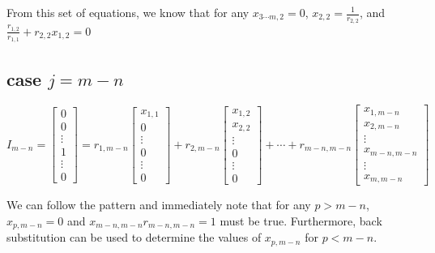 \documentclass[a4paper,12pt]{article}
\begin{document}
From this set of equations, we know that for any $x_{3\cdots m, 2} =0$, $x_{2,2}=\frac{1}{r_{2,2}}$, and $\frac{r_{1,2}}{r_{1,1}} + r_{2,2}x_{1,2} =0$


\subsection{case $j=m-n$ }



\begin{equation}
I_{m-n} =\begin{bmatrix}
           0 \\
           0 \\
           \vdots \\
           1 \\
           \vdots \\
           0
         \end{bmatrix} = r_{1,m-n} \begin{bmatrix}
           x_{1,1} \\
           0 \\
           \vdots \\
           0 \\
           \vdots \\
           0
         \end{bmatrix} + r_{2,m-n} \begin{bmatrix}
           x_{1,2} \\
           x_{2,2} \\
           \vdots \\
           0 \\
           \vdots \\
           0
           \end{bmatrix} + \cdots + r_{m-n,m-n}\begin{bmatrix}
           x_{1,m-n} \\
           x_{2,m-n} \\
           \vdots \\
           x_{m-n,m-n} \\
           \vdots \\
           x_{m,m-n}
           \end{bmatrix} 
\end{equation}

We can follow the pattern and immediately note that for any $p > m-n$, $x_{p,m-n} =0$ and $x_{m-n,m-n} r_{m-n,m-n} =1$ must be true. Furthermore, back substitution can be used to determine the values of $x_{p,m-n}$ for $p < m-n $.
\end{document}
